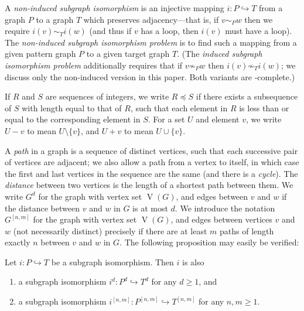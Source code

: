 \documentclass{llncs}
\begin{document}
A \emph{non-induced subgraph isomorphism} is an injective mapping $i : P \hookrightarrow T$ from a
graph $P$ to a graph $T$ which preserves adjacency---that is, if $v \sim_{P} w$ then we require
$i(v) \sim_{T} i(w)$ (and thus if $v$ has a loop, then $i(v)$ must have a loop). The
\emph{non-induced subgraph isomorphism problem} is to find such a mapping from a given pattern graph
$P$ to a given target graph $T$.  (The \emph{induced subgraph isomorphism problem} additionally
requires that if $v \not\sim_{P} w$ then $i(v) \not\sim_{T} i(w)$; we discuss only the non-induced
version in this paper. Both variants are \NP-complete.)

If $R$ and $S$ are sequences of integers, we write $R \preceq S$ if there exists a subsequence of
$S$ with length equal to that of $R$, such that each element in $R$ is less than or equal to the
corresponding element in $S$.  For a set $U$ and element $v$, we write $U - v$ to mean $U \setminus
\{ v \}$, and $U + v$ to mean $U \cup \{ v \}$.

A \emph{path} in a graph is a sequence of distinct vertices, such that each successive pair of
vertices are adjacent; we also allow a path from a vertex to itself, in which case the first and
last vertices in the sequence are the same (and there is a \emph{cycle}). The \emph{distance}
between two vertices is the length of a shortest path between them. We write $G^d$ for the graph
with vertex set $\operatorname{V}(G)$, and edges between $v$ and $w$ if the distance between $v$ and
$w$ in $G$ is at most $d$.  We introduce the notation $G^{\left[n, m\right]}$ for the graph with
vertex set $\operatorname{V}(G)$, and edges between vertices $v$ and $w$ (not necessarily distinct)
precisely if there are at least $m$ paths of length exactly $n$ between $v$ and $w$ in $G$. The
following proposition may easily be verified:

\begin{proposition}\label{proposition:supplemental}
    Let $i : P \hookrightarrow T$ be a subgraph isomorphism. Then $i$ is also
    \begin{enumerate}[itemindent=1em,topsep=0pt,itemsep=0.2pt]
        \item a subgraph isomorphism $i^d : P^d \hookrightarrow T^d$ for any $d \ge 1$, and
        \item a subgraph isomorphism $i^{\left[n, m\right]} : P^{\left[n, m\right]} \hookrightarrow
            T^{\left[n, m\right]}$ for any $n, m \ge 1$.
    \end{enumerate}
\end{proposition}
\end{document}
